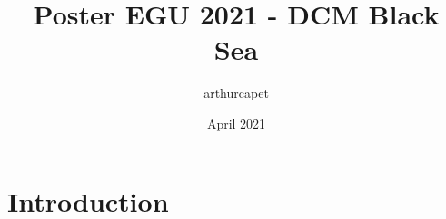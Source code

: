 \documentclass{article}
\title{Poster EGU 2021 - DCM Black Sea}
\author{arthurcapet }
\date{April 2021}
\begin{document}
\maketitle

\section{Introduction}
\end{document}
